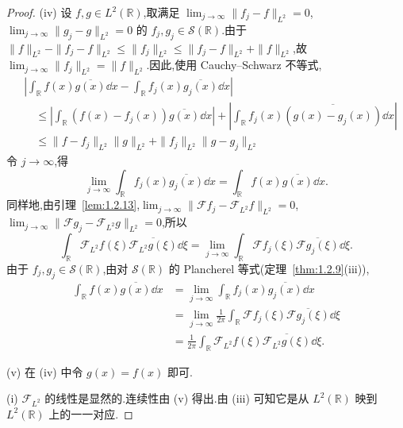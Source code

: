 \begin{proof}
(iv) 设 $f, g \in L^{2}(\mathbb{R})$,取满足 $\lim_{j \to \infty}\|f_{j} - f\|_{L^{2}} = 0$,$\lim_{j \to \infty}\|g_{j} - g\|_{L^{2}} = 0$ 的 $f_{j}, g_{j} \in \mathcal{S}(\mathbb{R})$.由于 $\|f\|_{L^{2}} - \|f_{j} - f\|_{L^{2}} \leq \|f_{j}\|_{L^{2}} \leq \|f_{j} - f\|_{L^{2}} + \|f\|_{L^{2}}$,故 $\lim_{j \to \infty}\|f_{j}\|_{L^{2}} = \|f\|_{L^{2}}$.因此,使用 Cauchy--Schwarz 不等式,
\begin{align*}
& \left|\int_{\mathbb{R}} f(x)\overline{g(x)}\dd x - \int_{\mathbb{R}} f_{j}(x)\overline{g_{j}(x)}\dd x\right| \\
& \quad \leq \left|\int_{\mathbb{R}} (f(x) - f_{j}(x))\overline{g(x)}\dd x\right| + \left|\int_{\mathbb{R}} f_{j}(x)\overline{(g(x) - g_{j}(x))}\dd x\right| \\
& \quad \leq \| f - f_{j} \|_{L^{2}}\| g \|_{L^{2}} + \| f_{j} \|_{L^{2}}\| g - g_{j} \|_{L^{2}}
\end{align*}
令 $j \to \infty$,得
\begin{equation*}
\lim_{j \to \infty}\int_{\mathbb{R}} f_{j}(x)\overline{g_{j}(x)}\dd x = \int_{\mathbb{R}} f(x)\overline{g(x)}\dd x.
\end{equation*}
同样地,由引理~\ref{lem:1.2.13},$\lim_{j \to \infty}\|\mathcal{F}f_{j} - \mathcal{F}_{L^{2}}f\|_{L^{2}} = 0$,$\lim_{j \to \infty}\|\mathcal{F}g_{j} - \mathcal{F}_{L^{2}}g\|_{L^{2}} = 0$,所以
\begin{equation*}
\int_{\mathbb{R}}\mathcal{F}_{L^{2}}f(\xi)\overline{\mathcal{F}_{L^{2}}g(\xi)}\dd \xi = \lim_{j \to \infty}\int_{\mathbb{R}}\mathcal{F}f_{j}(\xi)\overline{\mathcal{F}g_{j}(\xi)}\dd \xi.
\end{equation*}
由于 $f_{j}, g_{j} \in \mathcal{S}(\mathbb{R})$,由对 $\mathcal{S}(\mathbb{R})$ 的 Plancherel 等式(定理~\ref{thm:1.2.9}(iii)),
\begin{align*}
\int_{\mathbb{R}} f(x)\overline{g(x)}\dd x & = \lim_{j \to \infty}\int_{\mathbb{R}} f_{j}(x)\overline{g_{j}(x)}\dd x \\
& = \lim_{j \to \infty}\frac{1}{2\pi}\int_{\mathbb{R}}\mathcal{F}f_{j}(\xi)\overline{\mathcal{F}g_{j}(\xi)}\dd \xi \\
& = \frac{1}{2\pi}\int_{\mathbb{R}}\mathcal{F}_{L^{2}}f(\xi)\overline{\mathcal{F}_{L^{2}}g(\xi)}\dd \xi.
\end{align*}

(v) 在 (iv) 中令 $g(x) = f(x)$ 即可.

(i) $\mathcal{F}_{L^{2}}$ 的线性是显然的.连续性由 (v) 得出.由 (iii) 可知它是从 $L^{2}(\mathbb{R})$ 映到 $L^{2}(\mathbb{R})$ 上的一一对应.
\end{proof}

